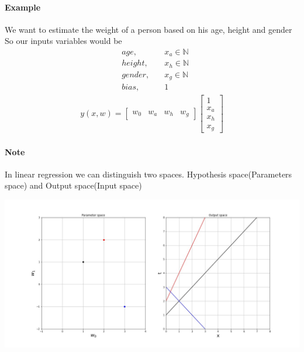 \documentclass[main.tex]{subfiles}
\begin{document}
\paragraph{Example} We want to estimate the weight of a person based on his age, height and gender
So our inputs variables would be
\begin{align*}
    &age,\quad &x_a\in \mathbb{N} \\
    &height,\quad &x_h\in \mathbb{N} \\
    &gender, \quad &x_g\in \mathbb{N} \\
    &bias, \quad &1
\end{align*}
\begin{align*}
    y(x,w)=
    \begin{bmatrix}w_0 & w_a & w_h & w_g\end{bmatrix}
    \begin{bmatrix}1\\ x_a \\ x_h \\x_g\end{bmatrix}
\end{align*}

\paragraph{Note} In linear regression we can distinguish two spaces. Hypothesis space(Parameters space) and Output space(Input space)

\begin{center}
    \includegraphics[scale=0.4]{img/param_input_space.jpg}
\end{center}
\end{document}
